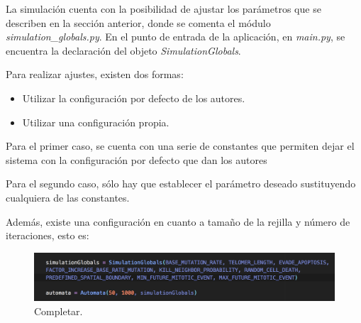 La simulación cuenta con la posibilidad de ajustar los parámetros que se describen en la sección anterior,
donde se comenta el módulo \textit{simulation\_globals.py}. En el punto de entrada de la aplicación,
en \textit{main.py}, se encuentra la declaración del objeto \textit{SimulationGlobals}.

Para realizar ajustes, existen dos formas:

\begin{itemize}
  \item Utilizar la configuración por defecto de los autores.
  \item Utilizar una configuración propia.
\end{itemize}

Para el primer caso, se cuenta con una serie de constantes que permiten dejar el sistema con la
configuración por defecto que dan los autores

Para el segundo caso, sólo hay que establecer el parámetro deseado sustituyendo cualquiera de las constantes.

Además, existe una configuración en cuanto a tamaño de la rejilla y número de iteraciones, esto es:

\begin{figure}[h]
\centering
\includegraphics[scale=0.6]{figures/simulations_globals}
\caption{Completar.}
\end{figure}

